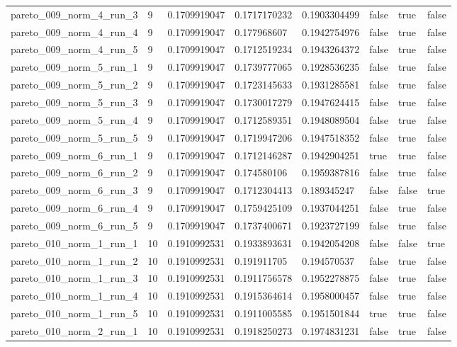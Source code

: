 \begin{tabular}{@{}llllllll@{}}
pareto\_009\_norm\_4\_run\_3 & 9 & 0.1709919047 & 0.1717170232 & 0.1903304499 & false & true & false \\
pareto\_009\_norm\_4\_run\_4 & 9 & 0.1709919047 & 0.177968607 & 0.1942754976 & false & true & false \\
pareto\_009\_norm\_4\_run\_5 & 9 & 0.1709919047 & 0.1712519234 & 0.1943264372 & false & true & false \\
pareto\_009\_norm\_5\_run\_1 & 9 & 0.1709919047 & 0.1739777065 & 0.1928536235 & false & true & false \\
pareto\_009\_norm\_5\_run\_2 & 9 & 0.1709919047 & 0.1723145633 & 0.1931285581 & false & true & false \\
pareto\_009\_norm\_5\_run\_3 & 9 & 0.1709919047 & 0.1730017279 & 0.1947624415 & false & true & false \\
pareto\_009\_norm\_5\_run\_4 & 9 & 0.1709919047 & 0.1712589351 & 0.1948089504 & false & true & false \\
pareto\_009\_norm\_5\_run\_5 & 9 & 0.1709919047 & 0.1719947206 & 0.1947518352 & false & true & false \\
pareto\_009\_norm\_6\_run\_1 & 9 & 0.1709919047 & 0.1712146287 & 0.1942904251 & true & true & false \\
pareto\_009\_norm\_6\_run\_2 & 9 & 0.1709919047 & 0.174580106 & 0.1959387816 & false & true & false \\
pareto\_009\_norm\_6\_run\_3 & 9 & 0.1709919047 & 0.1712304413 & 0.189345247 & false & false & true \\
pareto\_009\_norm\_6\_run\_4 & 9 & 0.1709919047 & 0.1759425109 & 0.1937044251 & false & true & false \\
pareto\_009\_norm\_6\_run\_5 & 9 & 0.1709919047 & 0.1737400671 & 0.1923727199 & false & true & false \\
pareto\_010\_norm\_1\_run\_1 & 10 & 0.1910992531 & 0.1933893631 & 0.1942054208 & false & false & true \\
pareto\_010\_norm\_1\_run\_2 & 10 & 0.1910992531 & 0.191911705 & 0.194570537 & false & true & false \\
pareto\_010\_norm\_1\_run\_3 & 10 & 0.1910992531 & 0.1911756578 & 0.1952278875 & false & true & false \\
pareto\_010\_norm\_1\_run\_4 & 10 & 0.1910992531 & 0.1915364614 & 0.1958000457 & false & true & false \\
pareto\_010\_norm\_1\_run\_5 & 10 & 0.1910992531 & 0.1911005585 & 0.1951501844 & true & true & false \\
pareto\_010\_norm\_2\_run\_1 & 10 & 0.1910992531 & 0.1918250273 & 0.1974831231 & false & true & false \\

\end{tabular}
